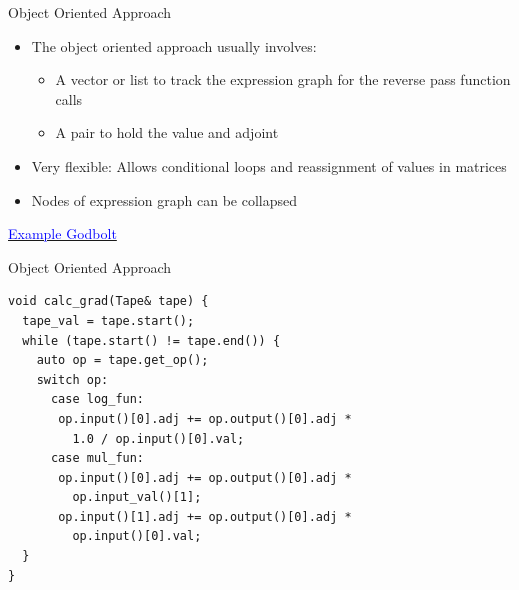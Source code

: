 \documentclass[dvipsnames]{beamer}
\newenvironment{CacheLine}[1][]{
  \begin{tikzpicture}[x=1.2cm,y=0.8cm,font=\footnotesize,>=Stealth,#1]
    \def\CacheH{1.0}   %
    \def\CacheBelow{1.0} %

}{
    \foreach \i in {1,...,7} { \draw[black!40] (\i,0) -- (\i,\CacheH); }
    \draw[line width=0.6pt, rounded corners=2pt] (0,0) rectangle (8,\CacheH);
    \foreach \i in {0,...,7} {
      \node[below=3pt, text=black!75] at (\i+0.5,0) {8B \i};
    }
  \end{tikzpicture}
}
\newcommand{\CacheColor}[2]{%
  \fill[#2, fill opacity=0.35, draw=none] (#1,0) rectangle ++(1,\CacheH);%
}
\newcommand{\CacheMarkBelow}[3][green!60!black]{%
  \draw[-{Stealth[length=3mm]}, very thick, draw=#1] (#2,-\CacheBelow+0.28) -- (#2,0.02);
  \node[below, text=#1] at (#2,-\CacheBelow+0.28) {#3};
}
\newcommand{\CacheSetBelow}[1]{\def\CacheBelow{#1}}
\begin{document}
\begin{frame}{Object Oriented Approach}
\begin{itemize}
    \item The object oriented approach usually involves: 
    \begin{itemize}
        \item A vector or list to track the expression graph for the reverse pass function calls
        \item A pair to hold the value and adjoint
    \end{itemize}
    \item Very flexible: Allows conditional loops and reassignment of values in matrices
    \item Nodes of expression graph can be collapsed
\end{itemize}
\centerline{\href{https://godbolt.org/z/je173T18Y}{\textcolor{blue}{Example Godbolt}}}
\end{frame}



\begin{frame}[fragile]{Object Oriented Approach}
\begin{verbatim}
void calc_grad(Tape& tape) {
  tape_val = tape.start();
  while (tape.start() != tape.end()) {
    auto op = tape.get_op();
    switch op:
      case log_fun:
       op.input()[0].adj += op.output()[0].adj * 
         1.0 / op.input()[0].val;
      case mul_fun:
       op.input()[0].adj += op.output()[0].adj * 
         op.input_val()[1];
       op.input()[1].adj += op.output()[0].adj * 
         op.input()[0].val;
  }
}
\end{verbatim}
\end{frame}
\end{document}
